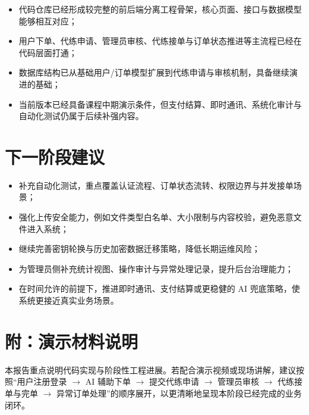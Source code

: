 ﻿\documentclass[12pt,a4paper]{ctexart}
\begin{document}
\begin{itemize}[leftmargin=2em]
  \item 代码仓库已经形成较完整的前后端分离工程骨架，核心页面、接口与数据模型能够相互对应；
  \item 用户下单、代练申请、管理员审核、代练接单与订单状态推进等主流程已经在代码层面打通；
  \item 数据库结构已从基础用户/订单模型扩展到代练申请与审核机制，具备继续演进的基础；
  \item 当前版本已经具备课程中期演示条件，但支付结算、即时通讯、系统化审计与自动化测试仍属于后续补强内容。
\end{itemize}

\section{下一阶段建议}

\begin{itemize}[leftmargin=2em]
  \item 补充自动化测试，重点覆盖认证流程、订单状态流转、权限边界与并发接单场景；
  \item 强化上传安全能力，例如文件类型白名单、大小限制与内容校验，避免恶意文件进入系统；
  \item 继续完善密钥轮换与历史加密数据迁移策略，降低长期运维风险；
  \item 为管理员侧补充统计视图、操作审计与异常处理记录，提升后台治理能力；
  \item 在时间允许的前提下，推进即时通讯、支付结算或更稳健的 AI 兜底策略，使系统更接近真实业务场景。
\end{itemize}

\section*{附：演示材料说明}
本报告重点说明代码实现与阶段性工程进展。若配合演示视频或现场讲解，建议按照“用户注册登录 $\rightarrow$ AI 辅助下单 $\rightarrow$ 提交代练申请 $\rightarrow$ 管理员审核 $\rightarrow$ 代练接单与完单 $\rightarrow$ 异常订单处理”的顺序展开，以更清晰地呈现本阶段已经完成的业务闭环。
\end{document}

